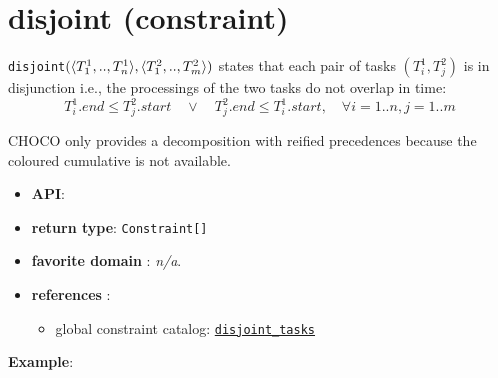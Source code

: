 \label{disjoint}
\hypertarget{disjoint}{}

\section{disjoint (constraint)}\label{disjoint:disjointconstraint}\hypertarget{disjoint:disjointconstraint}{}

\begin{notedef}
  \texttt{disjoint}$(\langle T^1_1,..,T^1_n\rangle, \langle T^2_1,..,T^2_m\rangle)$ states that each pair of tasks $(T^1_i, T^2_j)$ is in disjunction i.e., the processings of the two tasks do not overlap in time:
 $$T^1_i.end \le T^2_j.start\quad\lor\quad  T^2_j.end \le T^1_i.start,\quad \forall i=1..n, j=1..m $$  
\end{notedef}

CHOCO only provides a decomposition with reified precedences because the coloured cumulative is not available.

\begin{itemize}
	\item \textbf{API}: 
	\item \textbf{return type}: \texttt{Constraint[]}
	\item \textbf{favorite domain} : \emph{n/a}.
	\item \textbf{references} :
      \begin{itemize}
      \item global constraint catalog: \href{http://www.emn.fr/x-info/sdemasse/gccat/Cdisjoint_tasks.html}{\tt disjoint\_tasks}
      \end{itemize}
\end{itemize}
\textbf{Example}:

